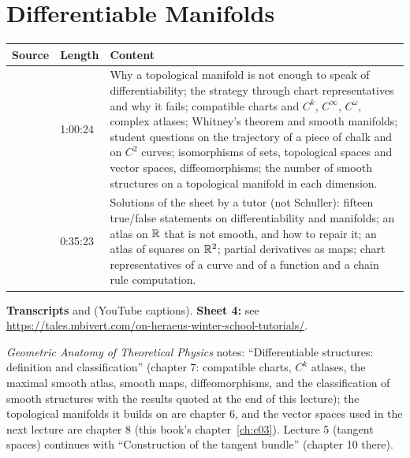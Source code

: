 \chapter{Differentiable Manifolds}\label{ch:c04}
\begin{paracol}{2}

\begin{sources}
\begin{tabularx}{\linewidth}{@{}l l L@{}}
\toprule
\textbf{Source} & \textbf{Length} & \textbf{Content}\\
\midrule
{} & 1:00:24 & Why a topological manifold is not enough to speak of differentiability; the strategy through chart representatives and why it fails;
compatible charts and $C^k$, $C^\infty$, $C^\omega$, complex atlases; Whitney's theorem and smooth manifolds; student questions on the trajectory of a piece of chalk and on $C^2$ curves; isomorphisms of sets, topological spaces and vector
spaces, diffeomorphisms; the number of smooth structures on a topological manifold in each dimension.\\
 & 0:35:23 & Solutions of the sheet by a tutor (not Schuller): fifteen true/false statements on differentiability and manifolds; an atlas on $\mathbb{R}$ that is not smooth, and how to repair it; an atlas of squares on $\mathbb{R}^2$;
partial derivatives as maps; chart representatives of a curve and of a function and a chain rule computation.\\
\bottomrule
\end{tabularx}

\smallskip
\textbf{Transcripts}  and  (YouTube captions).
\textbf{Sheet 4:} see \url{https://tales.mbivert.com/on-heraeus-winter-school-tutorials/}.
\end{sources}

\begin{reading}
\emph{Geometric Anatomy of Theoretical Physics} notes: ``Differentiable structures: definition and classification'' (chapter 7: compatible charts, $C^k$ atlases,
the maximal smooth atlas, smooth maps, diffeomorphisms, and the classification of smooth structures with the results quoted at the end of this lecture); the topological manifolds it builds on are chapter 6, and the vector spaces used
in the next lecture are chapter 8 (this book's chapter~\ref{ch:c03}). Lecture 5 (tangent spaces) continues with ``Construction of the tangent bundle'' (chapter 10 there).
\end{reading}


\end{paracol}
